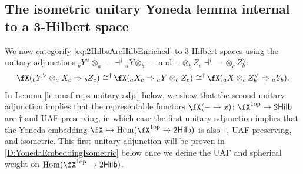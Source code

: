 \documentclass[12pt, reqno]{amsart}
\DeclareMathOperator{\Hom}{Hom}
\newcommand{\op}{\mathrm{op}}
\newcommand{\Hilb}{\mathsf{Hilb}}
\theoremstyle{plain}
\theoremstyle{definition}
\DeclareMathOperator{\isomeq}{\mathbin{\,\cong^\dag}}
\begin{document}
\subsection{The isometric unitary Yoneda lemma internal to a 3-Hilbert space}
\label{sec:UnitaryYoneda}

We now categorify \eqref{eq:2HilbsAreHilbEnriched} to 3-Hilbert spaces using the unitary adjunctions 
${}_bY^\vee \otimes_a - \dashv^\dag {}_aY\otimes_b -$
and
$-\otimes_b Z_c \dashv^\dag -\otimes_c Z^\vee_b$:
$$
\fX({}_bY^\vee \otimes_a X_c \Rightarrow {}_bZ_c) \isomeq
\fX({}_aX_c \Rightarrow {}_aY\otimes_b Z_c) \isomeq
\fX({}_a X \otimes_c Z^\vee_b \Rightarrow {}_aY_b).
$$
In Lemma \ref{lem:uaf-reps-unitary-adjs} below, we show that the second unitary adjunction implies that the representable functors $\fX(-\to x)\colon \fX^{1\op}\to 2\Hilb$ are $\dag$ and UAF-preserving,
in which case the first unitary adjunction implies
that the Yoneda embedding $\fX\hookrightarrow \Hom(\fX^{1\op}\to 2\Hilb)$ is also $\dag$, UAF-preserving, and isometric.
This first unitary adjunction will be proven in \ref{D:YonedaEmbeddingIsometric} below once we define the UAF and spherical weight on $\Hom(\fX^{1\op}\to 2\Hilb)$.
\end{document}
